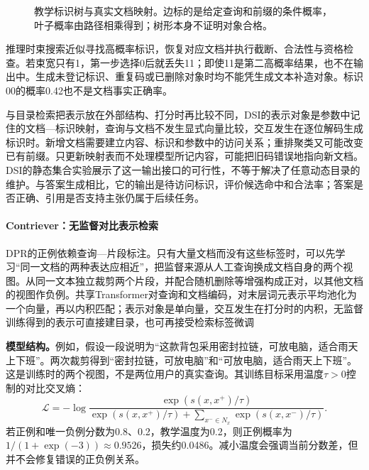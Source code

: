 \begin{figure}[htbp]
 \centering
  
 \caption{教学标识树与真实文档映射。边标的是给定查询和前缀的条件概率，叶子概率由路径相乘得到；树形本身不证明对象合格。}
 \label{fig:rs-search-identifiers}
\end{figure}

推理时束搜索近似寻找高概率标识，恢复对应文档并执行截断、合法性与资格检查。若束宽只有1，第一步选择0后就丢失11；即使11是第二高概率结果，也不在输出中。生成未登记标识、重复码或已删除对象时均不能凭生成文本补造对象。标识00的概率0.42也不是文档事实正确率。

与目录检索把表示放在外部结构、打分时再比较不同，DSI的表示对象是参数中记住的文档—标识映射，查询与文档不发生显式向量比较，交互发生在逐位解码生成标识时。新增文档需要建立内容、标识和参数中的访问关系；重排聚类又可能改变已有前缀。只更新映射表而不处理模型所记内容，可能把旧码错误地指向新文档。DSI的静态集合实验展示了这一输出接口的可行性，不等于解决了任意动态目录的维护。与答案生成相比，它的输出是待访问标识，评价候选命中和合法率；答案是否正确、引用是否支持主张仍属于后续任务。

\Needspace{100mm}
\paragraph{Contriever：无监督对比表示检索}
\label{sec:rs-search-contriever}

DPR的正例依赖查询—片段标注。只有大量文档而没有这些标签时，可以先学习“同一文档的两种表达应相近”，把监督来源从人工查询换成文档自身的两个视图。从同一文本独立裁剪两个片段，并配合随机删除等增强构成正对，以其他文档的视图作负例。共享Transformer对查询和文档编码，对末层词元表示平均池化为一个向量，再以内积匹配；表示对象是单向量，交互发生在打分时的内积，无监督训练得到的表示可直接建目录，也可再接受检索标签微调

\textbf{模型结构。}例如，假设一段说明为“这款背包采用密封拉链，可放电脑，适合雨天上下班”。两次裁剪得到“密封拉链，可放电脑”和“可放电脑，适合雨天上下班”。这是训练时的两个视图，不是两位用户的真实查询。其训练目标采用温度$\tau>0$控制的对比交叉熵：
\begin{equation}
 \mathcal L=-\log
 \frac{\exp(s(x,x^+)/\tau)}
 {\exp(s(x,x^+)/\tau)+\sum_{x^-\in N_x}\exp(s(x,x^-)/\tau)} .
 \label{eq:rs-search-contriever-objective}
\end{equation}
若正例和唯一负例分数为0.8、0.2，教学温度为0.2，则正例概率为$1/(1+\exp(-3))\approx0.9526$，损失约0.0486。减小温度会强调当前分数差，但并不会修复错误的正负例关系。

